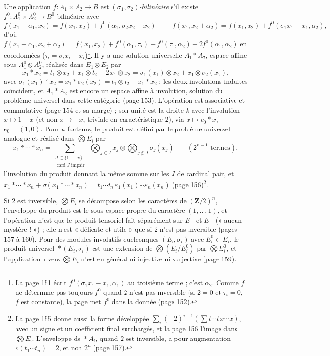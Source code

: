 \documentclass[11pt,a4paper]{article}
\begin{document}
Une application $f : A_1 \times A_2 \to B$ est \emph{$(\sigma_1,
\sigma_2)$-bilinéaire} s'il existe $f^0 : A_1^0 \times A_2^0 \to B^0$ bilinéaire
avec
\[
  f(x_1 + \alpha_1, x_2) = f(x_1, x_2) + f^0(\alpha_1, \sigma_2x_2 - x_2),\qquad
  f(x_1, x_2 + \alpha_2) = f(x_1, x_2) + f^0(\sigma_1x_1 - x_1, \alpha_2),
\]
d'où $f(x_1 + \alpha_1, x_2 + \alpha_2) = f(x_1, x_2) + f^0(\alpha_1, \tau_2) +
f^0(\tau_1, \alpha_2) - 2f^0(\alpha_1, \alpha_2)$ en coordonnées ($\tau_i =
\sigma_ix_i - x_i$)\footnote{La page 151 écrit $f^0(\sigma_1x_1 - x_1, \alpha_1)$
au troisième terme ; c'est $\alpha_2$. Comme $f$ ne détermine pas toujours
$f^0$ quand $2$ n'est pas inversible (si $2 = 0$ et $\tau_i = 0$, $f$ est
constante), la page met $f^0$ dans la donnée (page 152).}. Il y a une solution
universelle $A_1 * A_2$, espace affine sous $A_1^0 \otimes A_2^0$, réalisée
dans $E_1 \otimes E_2$ par
\[
  x_1 * x_2 = t_1 \otimes x_2 + x_1 \otimes t_2 - 2\,x_1 \otimes x_2 = \sigma_1(x_1)
  \otimes x_2 + x_1 \otimes \sigma_2(x_2),
\]
avec $\sigma_1(x_1) * x_2 = x_1 * \sigma_2(x_2) = t_1 \otimes t_2 - x_1 * x_2$ :
les deux involutions induites coïncident, et $A_1 * A_2$ est encore un espace
affine à involution, solution du problème universel dans cette catégorie (page
153). L'opération est associative et commutative (page 154 et sa marge) ; son
unité est la droite $k$ avec l'involution $x \mapsto 1 - x$ (et non $x \mapsto
-x$, triviale en caractéristique $2$), via $x \mapsto e_0 * x$, $e_0 = (1,
0)$. Pour $n$ facteurs, le produit est défini par le problème universel analogue
et réalisé dans $\bigotimes E_i$ par
\[
  x_1 * \cdots * x_n = \sum_{\substack{J \subset \{1, \ldots, n\} \\ \operatorname{card}J \text{ impair}}}
  \ \bigotimes_{j \in J} x_j \otimes \bigotimes_{j \notin J} \sigma_j(x_j)
  \qquad (2^{n-1} \text{ termes}),
\]
l'involution du produit donnant la même somme sur les $J$ de cardinal pair,
et $x_1 * \cdots * x_n + \sigma(x_1 * \cdots * x_n) = t_1\cdots
t_n\,\varepsilon_1(x_1)\cdots\varepsilon_n(x_n)$ (page 156)\footnote{La page
155 donne aussi la forme développée $\sum_i (-2)^{i-1}(\sum t\cdots t\,x\cdots
x)$, avec un signe et un coefficient final surchargés, et la page 156 l'image
dans $\bigotimes E_i$. L'enveloppe de $\mathop{*}A_i$, quand $2$ est inversible,
a pour augmentation $\varepsilon(t_1\cdots t_n) = 2$, et non $2^n$ (page 157).}.

Si $2$ est inversible, $\bigotimes E_i$ se décompose selon les caractères de
$(\mathbf{Z}/2)^n$, l'enveloppe du produit est le sous-espace propre du
caractère $(1, \ldots, 1)$, et l'opération n'est que le produit tensoriel fait
séparément sur $E^-$ et $E^+$ (« aucun mystère ! ») ; elle n'est « délicate et
utile » que si $2$ n'est pas inversible (pages 157 à 160). Pour des modules
involutifs quelconques $(E_i, \sigma_i)$ avec $E_i^0 \subset E_i$, le produit
universel $\mathop{*}(E_i, \sigma_i)$ est une extension de $\bigotimes(E_i/E_i^0)$
par $\bigotimes E_i^0$, et l'application $\tau$ vers $\bigotimes E_i$ n'est en
général ni injective ni surjective (page 159).
\end{document}
